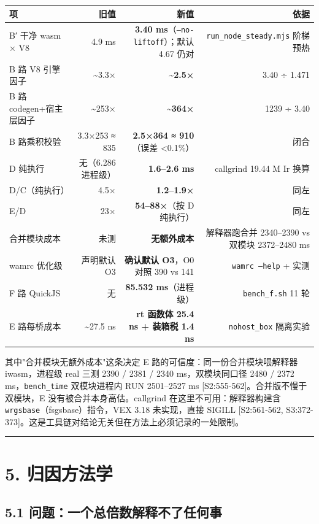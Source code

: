 \documentclass[11pt, a4paper]{article}
\begin{document}
\begin{center}\small\begin{tabular}{lrrr}
\toprule
项 & 旧值 & 新值 & 依据 \\
\midrule
B′ 干净 wasm × V8 & 4.9 ms & \textbf{3.40 ms}（\texttt{--no-liftoff}）；默认 4.67 仍对 & \texttt{run\_node\_steady.mjs} 阶梯预热 \\
B 路 V8 引擎因子 & \textasciitilde{}3.3× & \textbf{\textasciitilde{}2.5×} & 3.40 ÷ 1.471 \\
B 路 codegen+宿主层因子 & \textasciitilde{}253× & \textbf{\textasciitilde{}364×} & 1239 ÷ 3.40 \\
B 路乘积校验 & 3.3×253 ≈ 835 & \textbf{2.5×364 ≈ 910}（误差 <0.1\%） & 闭合 \\
D 纯执行 & 无（6.286 进程级） & \textbf{1.6–2.6 ms} & callgrind 19.44 M Ir 换算 \\
D/C（纯执行） & 4.5× & \textbf{1.2–1.9×} & 同左 \\
E/D & 23× & \textbf{54–88×}（按 D 纯执行） & 同左 \\
合并模块成本 & 未测 & \textbf{无额外成本} & 解释器跑合并 2340–2390 vs 双模块 2372–2480 ms \\
wamrc 优化级 & 声明默认 O3 & \textbf{确认默认 O3}，O0 对照 390 vs 141 & \texttt{wamrc --help} + 实测 \\
F 路 QuickJS & 无 & \textbf{85.532 ms}（进程级） & \texttt{bench\_f.sh} 11 轮 \\
E 路每桥成本 & \textasciitilde{}27.5 ns & \textbf{rt 函数体 25.4 ns + 装箱税 1.4 ns} & \texttt{nohost\_box} 隔离实验 \\
\bottomrule
\end{tabular}\end{center}


其中"合并模块无额外成本"这条决定 E 路的可信度：同一份合并模块喂解释器 iwasm，进程级 real 三测 2390 / 2381 / 2340 ms，双模块同口径 2480 / 2372 ms，\texttt{bench\_time} 双模块进程内 RUN 2501–2527 ms [S2:555-562]。合并版不慢于双模块，E 没有被合并本身高估。callgrind 在这里不可用：解释器构建含 \texttt{wrgsbase}（fsgsbase）指令，VEX 3.18 未实现，直接 SIGILL [S2:561-562, S3:372-373]。这是工具链对结论无关但在方法上必须记录的一处限制。


\bigskip\hrule\bigskip

\section{5. 归因方法学}

\subsection{5.1 问题：一个总倍数解释不了任何事}
\end{document}
